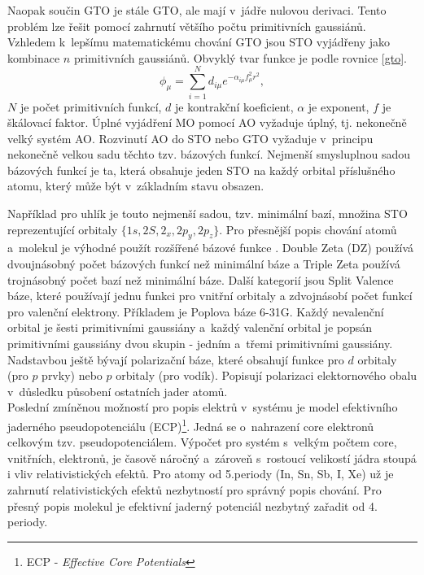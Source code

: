 \documentclass[
digital, %
table,   %
lof,     %
lot,     %
oneside,
]{fithesis3}
\begin{document}
Naopak součin GTO je stále GTO, ale mají v~jádře nulovou derivaci. Tento problém lze řešit pomocí zahrnutí většího počtu primitivních gaussiánů. Vzhledem k~lepšímu matematickému chování GTO jsou STO vyjádřeny jako kombinace $n$ primitivních gaussiánů. Obvyklý tvar funkce je podle rovnice \ref{gto}.
\begin{equation}
\phi_\mu = \sum_{i=1}^{N}d_{i\mu}e^{-\alpha_{i\mu}f^2_{\mu}r^2},
\label{gto}
\end{equation}
$N$ je počet primitivních funkcí, $d$ je kontrakční koeficient, $\alpha$ je exponent, $f$ je škálovací faktor. Úplné vyjádření MO pomocí AO vyžaduje úplný, tj. nekonečně velký systém AO. Rozvinutí AO do STO nebo GTO vyžaduje v~principu nekonečně velkou sadu těchto tzv. bázových funkcí. Nejmenší smysluplnou sadou bázových funkcí je ta, která obsahuje jeden STO na každý orbital příslušného atomu, který může být v~základním stavu obsazen.

Například pro uhlík je touto nejmenší sadou, tzv. minimální bazí, množina STO reprezentující orbitaly $\{1s, 2S, 2_x, 2p_y, 2p_z \}$. Pro přesnější popis chování atomů a~molekul je výhodné použít rozšířené bázové funkce \cite{lowe2011quantum}.
Double Zeta (DZ) používá dvoujnásobný počet bázových funkcí než minimální báze a Triple Zeta používá trojnásobný počet bazí než minimální báze. Další kategorií jsou Split Valence báze, které používají jednu funkci pro vnitřní orbitaly a zdvojnásobí počet funkcí pro valenční elektrony. Příkladem je Poplova báze 6-31G. Každý nevalenční orbital je šesti primitivními gaussiány a~každý valenční orbital je popsán primitivními gaussiány dvou skupin - jedním a~třemi primitivními gaussiány. Nadstavbou ještě bývají polarizační báze, které obsahují funkce pro $d$ orbitaly (pro $p$ prvky) nebo $p$ orbitaly (pro vodík). Popisují polarizaci elektornového obalu v~důsledku působení ostatních jader atomů. \\

Poslední zmíněnou možností pro popis elektrů v~systému je model efektivního jaderného pseudopotenciálu (ECP)\footnote{ECP - \textit{Effective Core Potentials}}. Jedná se o~nahrazení core elektronů celkovým tzv. pseudopotenciálem. Výpočet pro systém s~velkým počtem core, vnitřních, elektronů, je časově náročný a~zároveň s~rostoucí velikostí jádra stoupá i vliv relativistických efektů. Pro atomy od 5.periody (In, Sn, Sb, I, Xe) už je zahrnutí relativistických efektů nezbytností pro správný popis chování. Pro přesný popis molekul je efektivní jaderný potenciál nezbytný zařadit od 4. periody.
\end{document}
